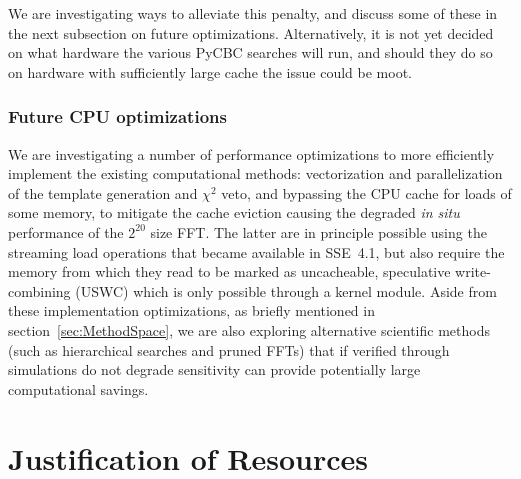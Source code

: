 We are investigating ways to alleviate this penalty, and discuss some of these
in the next subsection on future optimizations. Alternatively, it is not yet
decided on what hardware the various PyCBC searches will run, and should they do
so on hardware with sufficiently large cache the issue could be moot.

\vspace*{-10pt}
\subsubsection{Future CPU optimizations}
\vspace*{-05pt}

We are investigating a number of performance optimizations to more efficiently
implement the existing computational methods: vectorization and parallelization
of the template generation and $\chi^2$ veto, and bypassing the CPU cache for
loads of some memory, to mitigate the cache eviction causing the degraded
\textit{in situ} performance of the $2^{20}$ size FFT. The latter are in
principle possible using the streaming load operations that became available in
SSE~4.1, but also require the memory from which they read to be marked as
uncacheable, speculative write-combining (USWC) which is only possible through a
kernel module. Aside from these implementation optimizations, as briefly
mentioned in section~\ref{sec:MethodSpace}, we are also exploring alternative
scientific methods (such as hierarchical searches and pruned FFTs) that if
verified through simulations do not degrade sensitivity can provide potentially
large computational savings.

\vspace*{-10pt}
\section{Justification of Resources}
\vspace*{-05pt}
\label{sec:justification}

